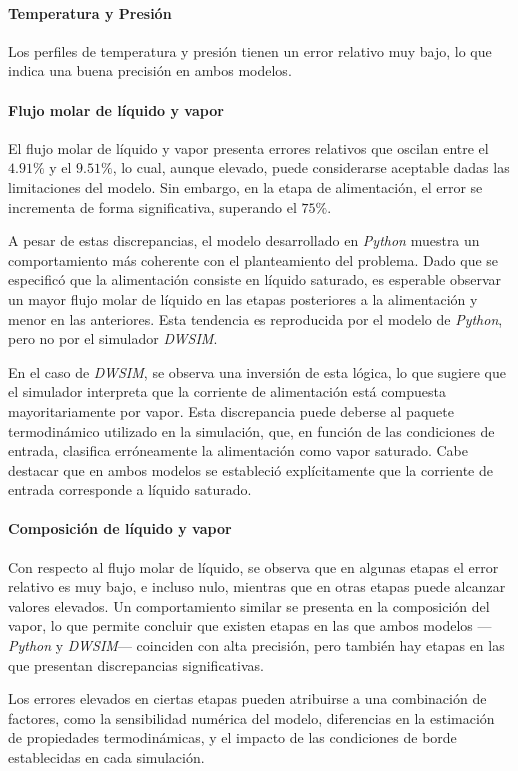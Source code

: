 \paragraph{Temperatura y Presión}
Los perfiles de temperatura y presión tienen un error relativo muy bajo, lo que indica una buena precisión en ambos modelos.
\paragraph{Flujo molar de líquido y vapor}
El flujo molar de líquido y vapor presenta errores relativos que oscilan entre el \(4.91\%\) y el \(9.51\%\), lo cual, aunque elevado, puede considerarse aceptable dadas las limitaciones del modelo. Sin embargo, en la etapa de alimentación, el error se incrementa de forma significativa, superando el \(75\%\).

A pesar de estas discrepancias, el modelo desarrollado en \textit{Python} muestra un comportamiento más coherente con el planteamiento del problema. Dado que se especificó que la alimentación consiste en líquido saturado, es esperable observar un mayor flujo molar de líquido en las etapas posteriores a la alimentación y menor en las anteriores. Esta tendencia es reproducida por el modelo de \textit{Python}, pero no por el simulador \textit{DWSIM}.

En el caso de \textit{DWSIM}, se observa una inversión de esta lógica, lo que sugiere que el simulador interpreta que la corriente de alimentación está compuesta mayoritariamente por vapor. Esta discrepancia puede deberse al paquete termodinámico utilizado en la simulación, que, en función de las condiciones de entrada, clasifica erróneamente la alimentación como vapor saturado. Cabe destacar que en ambos modelos se estableció explícitamente que la corriente de entrada corresponde a líquido saturado.
\paragraph{Composición de líquido y vapor}
Con respecto al flujo molar de líquido, se observa que en algunas etapas el error relativo es muy bajo, e incluso nulo, mientras que en otras etapas puede alcanzar valores elevados. Un comportamiento similar se presenta en la composición del vapor, lo que permite concluir que existen etapas en las que ambos modelos —\textit{Python} y \textit{DWSIM}— coinciden con alta precisión, pero también hay etapas en las que presentan discrepancias significativas.

Los errores elevados en ciertas etapas pueden atribuirse a una combinación de factores, como la sensibilidad numérica del modelo, diferencias en la estimación de propiedades termodinámicas, y el impacto de las condiciones de borde establecidas en cada simulación.
